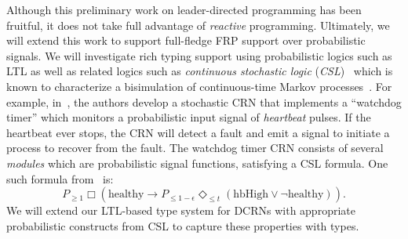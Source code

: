 Although this preliminary work on leader-directed programming has been fruitful, it does not take full advantage of \emph{reactive} programming.
Ultimately, we will extend this work to support full-fledge FRP support over probabilistic signals.
We will investigate rich typing support using probabilistic logics such as LTL as well as related logics such as \emph{continuous stochastic logic} (\emph{CSL})~\cite{cASSB96} which is known to characterize a bisimulation of continuous-time Markov processes~\cite{DESHARNAIS200399}.
For example, in~\cite{jEKLLLM17}, the authors develop a stochastic CRN that implements a ``watchdog timer'' which monitors a probabilistic input signal of \emph{heartbeat} pulses.
If the heartbeat ever stops, the CRN will detect a fault and emit a signal to initiate a process to recover from the fault.
The watchdog timer CRN consists of several \emph{modules} which are probabilistic signal functions, satisfying a CSL formula.
One such formula from~\cite{jEKLLLM17} is:
\[
    P_{\ge 1}\Box\left(\text{healthy} \rightarrow P_{\le1-\epsilon}\Diamond_{\le t}(\text{hbHigh}\lor\lnot\text{healthy})\right).
\]
We will extend our LTL-based type system for DCRNs with appropriate probabilistic constructs from CSL to capture these properties with types.



